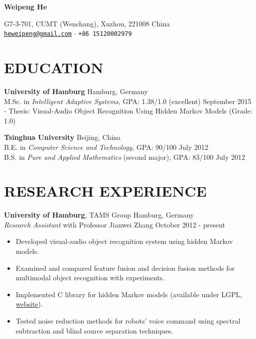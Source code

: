 \documentclass[a4paper,11pt]{article} %
\newcommand{\ind}{\hspace*{1em}}
\begin{document}
\thispagestyle{empty}


\begin{center}
  {\Huge\bfseries Weipeng He}

  G7-3-701, CUMT (Wenchang), Xuzhou, 221008 China \\
  \href{mailto:heweipeng@gmail.com}{\texttt{heweipeng@gmail.com}} $\cdotp$
  \texttt{+86 15120002979}
\end{center}


\section{EDUCATION}
\textbf{University of Hamburg} \hfill Hamburg, Germany \\
\ind M.Sc. in \textit{Intelligent Adaptive Systems}, GPA: 1.38/1.0 (excellent)  \hfill September 2015 \\
\ind - Thesis: Visual-Audio Object Recognition Using Hidden Markov Models (Grade: 1.0)

\textbf{Tsinghua University} \hfill Beijing, China \\
\ind B.E. in \textit{Computer Science and Technology}, GPA: 90/100 \hfill July 2012 \\
\ind B.S. in \textit{Pure and Applied Mathematics} (second major), GPA: 83/100 \hfill July 2012


\section{RESEARCH EXPERIENCE}

\textbf{University of Hamburg}, TAMS Group \hfill Hamburg, Germany \\
\textit{Research Assistant} with Professor Jianwei Zhang \hfill October 2012 - present
\vspace{-\parskip}
\begin{itemize}
  \item Developed visual-audio object recognition system using hidden Markov models.
  \item Examined and compared feature fusion and decision fusion methods for multimodal object recognition with experiments.
  \item Implemented C library for hidden Markov models (available under LGPL, \href{https://github.com/hwp/notGHMM}{website}).
  \item Tested noise reduction methods for robots' voice command using spectral subtraction and blind source separation techniques.
\end{itemize}
\end{document}
